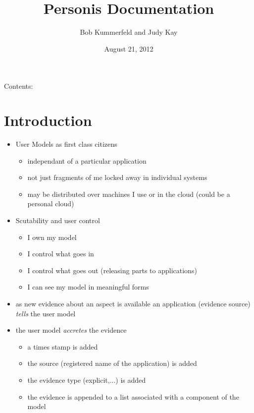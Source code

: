 \documentclass[letterpaper,10pt,english]{sphinxmanual}
\title{Personis Documentation}
\date{August 21, 2012}
\author{Bob Kummerfeld and Judy Kay}
\begin{document}
\maketitle
\tableofcontents
{}\label{index::doc}


Contents:


\chapter{Introduction}
\label{Intro:introduction}\label{Intro::doc}\label{Intro:personis-user-modeling-framework}\begin{itemize}
\item {} 
User Models as first class citizens
\begin{itemize}
\item {} 
independant of a particular application

\item {} 
not just fragments of me locked away in individual systems

\item {} 
may be distributed over machines I use or in the cloud (could be a personal cloud)

\end{itemize}

\item {} 
Scutability and user control
\begin{itemize}
\item {} 
I own my model

\item {} 
I control what goes in

\item {} 
I control what goes out (releasing parts to applications)

\item {} 
I can see my model in meaningful forms

\end{itemize}

\item {} 
as new evidence about an aspect is available an application (evidence source) \emph{tells} the user model

\item {} 
the user model \emph{accretes} the evidence
\begin{itemize}
\item {} 
a times stamp is added

\item {} 
the source (registered name of the application) is added

\item {} 
the evidence type (explicit,...) is added

\item {} 
the evidence is appended to a list associated with a component of the model

\end{itemize}

\end{itemize}
\end{document}
